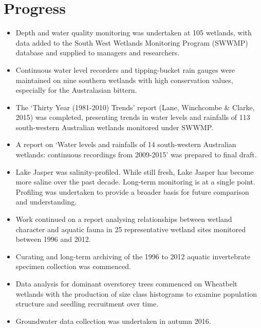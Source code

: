 \documentclass[version=last,
    paper=a4, %
    10pt, %
    usenames,
    dvipsnames,
    oneside, %
    headings=openany, %
    DIV=15 %
]{scrbook}
\begin{document}
\section*{Progress}
\begin{itemize}
\itemsep1pt\parskip0pt
\item
  Depth and water quality monitoring was undertaken at 105 wetlands,
  with data added to the South West Wetlands Monitoring Program (SWWMP)
  database and supplied to managers and researchers.
\item
  Continuous water level recorders and tipping-bucket rain gauges were
  maintained on nine southern wetlands with high conservation values,
  especially for the Australasian bittern.
\item
  The `Thirty Year (1981-2010) Trends' report (Lane, Winchcombe \&
  Clarke, 2015) was completed, presenting trends in water levels and
  rainfalls of 113 south-western Australian wetlands monitored under
  SWWMP.
\item
  A report on `Water levels and rainfalls of 14 south-western Australian
  wetlands: continuous recordings from 2009-2015' was prepared to final
  draft.
\item
  Lake Jasper was salinity-profiled. While still fresh, Lake Jasper has
  become more saline over the past decade. Long-term monitoring is at a
  single point. Profiling was undertaken to provide a broader basis for
  future comparison and understanding.
\item
  Work continued on a report analysing relationships between wetland
  character and aquatic fauna in 25 representative wetland sites
  monitored between 1996 and 2012.
\item
  Curating and long-term archiving of the 1996 to 2012 aquatic
  invertebrate specimen collection was commenced.
\item
  Data analysis for dominant overstorey trees commenced on Wheatbelt
  wetlands with the production of size class histograms to examine
  population structure and seedling recruitment over time.
\item
  Groundwater data collection was undertaken in autumn 2016.
\end{itemize}
\end{document}

